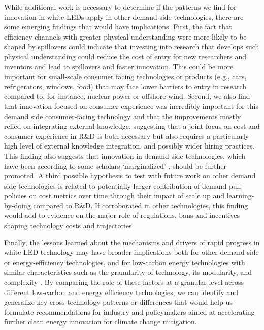 \documentclass[parskip=full]{article}
\begin{document}
While additional work is necessary to determine if the patterns we find for innovation in white LEDs apply in other demand side technologies, there are some emerging findings that would have implications. First, the fact that efficiency channels with greater physical understanding were more likely to be shaped by spillovers could indicate that investing into research that develops such physical understanding could reduce the cost of entry for new researchers and inventors and lead to spillovers and faster innovation. This could be more important for small-scale consumer facing technologies or products (e.g., cars, refrigerators, windows, food) that may face lower barriers to entry in research compared to, for instance, nuclear power or offshore wind. Second, we also find that innovation focused on consumer experience was incredibly important for this demand side consumer-facing technology and that the improvements mostly relied on integrating external knowledge, suggesting that a joint focus on cost and consumer experience in R\&D is both necessary but also requires a particularly high level of external knowledge integration, and possibly wider hiring practices. This finding also suggests that innovation in demand-side technologies, which have been according to some scholars ‘marginalized’ \cite{Wilson2012}, should be further promoted. A third possible hypothesis to test with future work on other demand side technologies is related to potentially larger contribution of demand-pull policies on cost metrics over time through their impact of scale up and learning-by-doing compared to R\&D. If corroborated in other technologies, this finding would add to evidence on the major role of regulations, bans and incentives shaping technology costs and trajectories.

Finally, the lessons learned about the mechanisms and drivers of rapid progress in white LED technology may have broader implications both for other demand-side or energy-efficiency technologies, and for low-carbon energy technologies with similar characteristics such as the granularity of technology, its modularity, and complexity \cite{malhotra2020accelerating, Wilson2012}. By comparing the role of these factors at a granular level across different low-carbon and energy efficiency technologies, we can identify and generalize key cross-technology patterns or differences that would help us formulate recommendations for industry and policymakers aimed at accelerating further clean energy innovation for climate change mitigation.
\end{document}
